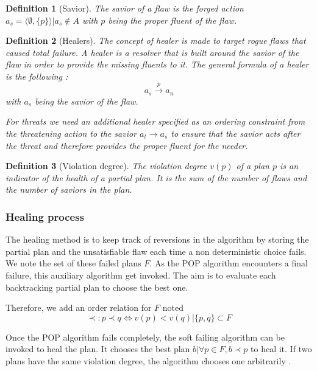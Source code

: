\documentclass[]{article}
\newtheorem{definition}{Definition}
\begin{document}
\begin{definition}[Savior]

The savior of a flaw is the forged action
\(a_s = \langle \emptyset, \{p\} \rangle | a_s \notin A\) with \(p\)
being the proper fluent of the flaw.

\end{definition}

\begin{definition}[Healers]

The concept of healer is made to target rogue flaws that caused total
failure. A healer is a resolver that is built around the savior of the
flaw in order to provide the missing fluents to it. The general formula
of a healer is the following : \[a_s \xrightarrow{p} a_n\] with \(a_s\)
being the savior of the flaw.

For threats we need an additional healer specified as an ordering
constraint from the threatening action to the savior \(a_t \to a_s\) to
ensure that the savior acts after the threat and therefore provides the
proper fluent for the needer.

\end{definition}

\begin{definition}[Violation degree]

The violation degree \(v(p)\) of a plan \(p\) is an indicator of the
health of a partial plan. It is the sum of the number of flaws and the
number of saviors in the plan.

\end{definition}

\subsubsection{Healing process}\label{healing-process}

The healing method is to keep track of reversions in the algorithm by
storing the partial plan and the unsatisfiable flaw each time a non
deterministic choice fails. We note the set of these failed plans \(F\).
As the POP algorithm encounters a final failure, this auxiliary
algorithm get invoked. The aim is to evaluate each backtracking partial
plan to choose the best one.

Therefore, we add an order relation for \(F\) noted
\[\prec : p \prec q \iff v(p) < v(q) | \{p, q\} \subset F\]

Once the POP algorithm fails completely, the soft failing algorithm can
be invoked to heal the plan. It chooses the best plan
\(b | \forall p \in F, b \prec p\) to heal it. If two plans have the
same violation degree, the algorithm chooses one arbitrarily .
\end{document}
